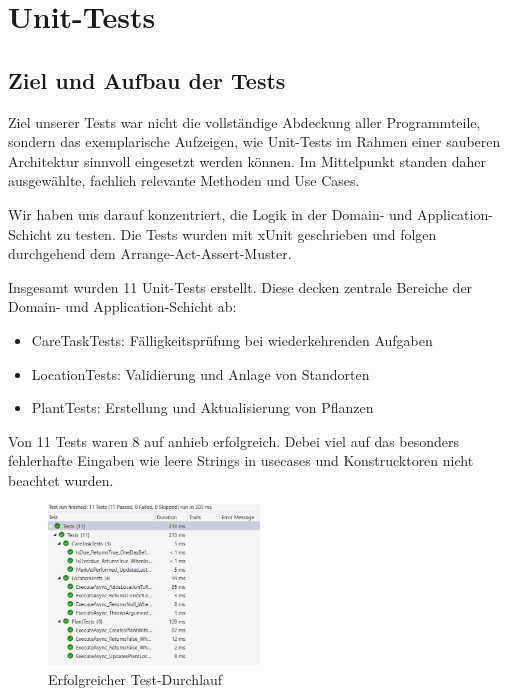 \chapter{Unit-Tests}
\section{Ziel und Aufbau der Tests}
Ziel unserer Tests war nicht die vollständige Abdeckung aller Programmteile, sondern das exemplarische Aufzeigen, wie Unit-Tests im Rahmen einer
sauberen Architektur sinnvoll eingesetzt werden können. Im Mittelpunkt standen daher ausgewählte, fachlich relevante Methoden und Use Cases.

Wir haben uns darauf konzentriert, die Logik in der Domain- und Application-Schicht zu testen. Die Tests wurden mit xUnit geschrieben und folgen
durchgehend dem Arrange-Act-Assert-Muster.

Insgesamt wurden 11 Unit-Tests erstellt. Diese decken zentrale Bereiche der Domain- und Application-Schicht ab:

\begin{itemize}
    \item CareTaskTests: Fälligkeitsprüfung bei wiederkehrenden Aufgaben
    \item LocationTests: Validierung und Anlage von Standorten
    \item PlantTests: Erstellung und Aktualisierung von Pflanzen
\end{itemize}

Von 11 Tests waren 8 auf anhieb erfolgreich. Debei viel auf das besonders fehlerhafte Eingaben wie leere Strings in usecases und Konstrucktoren nicht
beachtet wurden.

\begin{figure}[H]
\centering
\includegraphics[width=0.50\textwidth]{img/tests.png}
\caption{Erfolgreicher Test-Durchlauf}
\end{figure}

